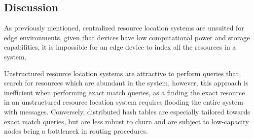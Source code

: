 \subsection{Discussion}

As previously mentioned, centralized resource location systems are unsuited for edge environments, given that devices have low computational power and storage capabilities, it is impossible for an edge device to index all the resources in a system.

Unstructured resource location systems are attractive to perform queries that search for resources which are abundant in the system, however, this approach is inefficient when performing exact match queries, as a finding the exact resource in an unstructured resource location system requires flooding the entire system with messages. Conversely, distributed hash tables are especially tailored towards exact match queries, but are less robust to churn and are subject to low-capacity nodes being a bottleneck in routing procedures. 









